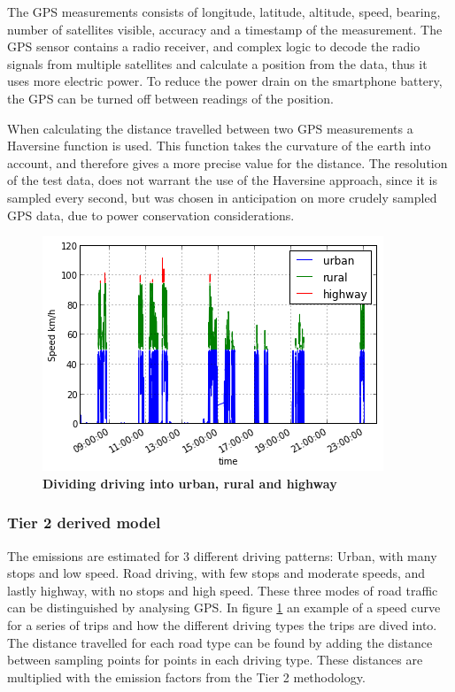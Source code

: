 The GPS measurements consists of longitude, latitude, altitude, speed, bearing, number of satellites visible, accuracy and a timestamp of the measurement. The GPS sensor contains a radio receiver, and complex logic to decode the radio signals from multiple satellites and calculate a position from the data, thus it uses more electric power. To reduce the power drain on the smartphone battery, the GPS can be turned off between readings of the position. 



When calculating the distance travelled between two GPS measurements a Haversine function is used. This function takes the curvature of the earth into account, and therefore gives a more precise value for the distance. The resolution of the test data, does not warrant the use of the Haversine approach, since it is sampled every second, but was chosen in anticipation on more crudely sampled GPS data, due to power conservation considerations.
\begin{figure}[!ht]
\begin{center}
\includegraphics{speed_division.png}
\caption{{\bf Dividing driving into urban, rural and highway}}
\label{speed_division}
\end{center}
\end{figure}

\subsubsection{Tier 2 derived model}
The emissions are estimated for 3 different driving patterns: Urban, with many stops and low speed. Road driving, with few stops and moderate speeds, and lastly highway, with no stops and high speed. These three modes of road traffic can be distinguished by analysing GPS.  In figure \ref{speed_division} an example of a speed curve for a series of trips and how the different driving types the trips are dived into. The distance travelled for each road type can be found by adding the distance between sampling points for points in each driving type. These distances are multiplied with the emission factors from the Tier 2 methodology.


